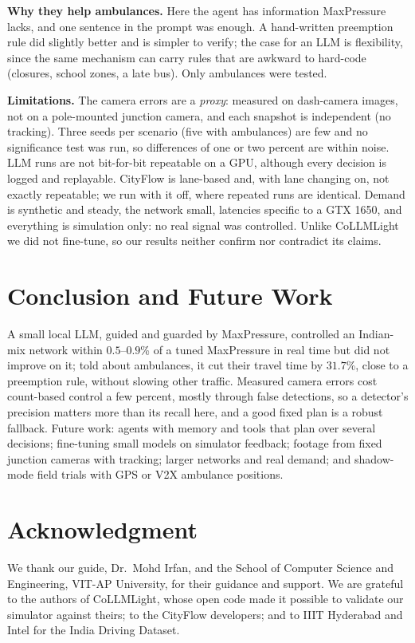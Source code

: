 \documentclass[conference]{IEEEtran}
\newcommand{\V}[2]{\ensuremath{#2}}
\begin{document}
\textbf{Why they help ambulances.} Here the agent has information MaxPressure lacks, and one
sentence in the prompt was enough. A hand-written preemption rule did slightly better and is
simpler to verify; the case for an LLM is flexibility, since the same mechanism can carry rules
that are awkward to hard-code (closures, school zones, a late bus). Only ambulances were tested.

\textbf{Limitations.} The camera errors are a \emph{proxy}: measured on dash-camera images, not
on a pole-mounted junction camera, and each snapshot is independent (no tracking). Three seeds
per scenario (five with ambulances) are few and no significance test was run, so differences of one or two percent are within noise. LLM runs are not bit-for-bit repeatable on a GPU, although every
decision is logged and replayable. CityFlow is lane-based and, with lane changing on, not
exactly repeatable; we run with it off, where repeated runs are identical. Demand is synthetic
and steady, the network small, latencies specific to a GTX 1650, and everything is simulation
only: no real signal was controlled. Unlike CoLLMLight we did not fine-tune, so our results
neither confirm nor contradict its claims.

\section{Conclusion and Future Work}

A small local LLM, guided and guarded by MaxPressure, controlled an Indian-mix network within
\V{f.peak.llm.vs_mp}{0.5}--\V{f.off.llm.vs_mp}{0.9}\% of a tuned MaxPressure in real time but
did not improve on it; told about ambulances, it cut their travel time by
\V{e.llm.amb_cut_vs_mp}{31.7}\%, close to a preemption rule, without slowing other traffic.
Measured camera errors cost count-based control a few percent, mostly through false detections,
so a detector's precision matters more than its recall here, and a good fixed plan is a robust
fallback. Future work: agents with memory and tools that plan over several decisions;
fine-tuning small models on simulator feedback; footage from fixed junction cameras with
tracking; larger networks and real demand; and shadow-mode field trials with GPS or V2X
ambulance positions.

\section*{Acknowledgment}
We thank our guide, Dr.\ Mohd Irfan, and the School of Computer Science and Engineering,
VIT-AP University, for their guidance and support. We are grateful to the authors of CoLLMLight,
whose open code made it possible to validate our simulator against theirs; to the CityFlow
developers; and to IIIT Hyderabad and Intel for the India Driving Dataset.



\end{document}
